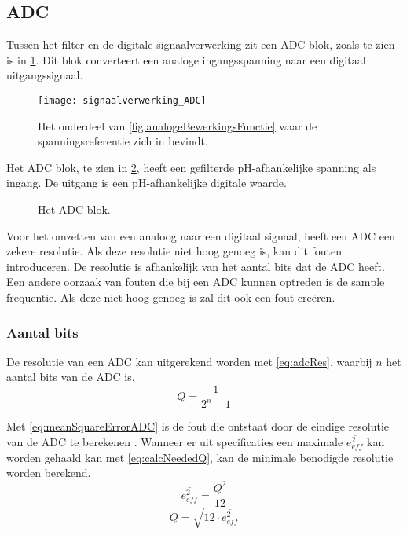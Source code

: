 \subsection{ADC}
Tussen het filter en de digitale signaalverwerking zit een ADC blok, zoals te zien is in \cref{fig:ADCInSchema}. Dit blok converteert een analoge ingangsspanning naar een digitaal uitgangssignaal.

\begin{figure}[!htbp]
    \centering
    \texttt{[image: signaalverwerking\_ADC]}
    \caption{Het onderdeel van \cref{fig:analogeBewerkingsFunctie} waar de spanningsreferentie zich in bevindt.}
    \label{fig:ADCInSchema}
\end{figure}

Het ADC blok, te zien in \cref{fig:ADCBlok}, heeft een gefilterde pH-afhankelijke spanning als ingang. De uitgang is een pH-afhankelijke digitale waarde.

\begin{figure}[!htbp]
    \centering
    \def\svgwidth{0.4\textwidth}
    
    \caption{Het ADC blok.}
    \label{fig:ADCBlok}
\end{figure}

Voor het omzetten van een analoog naar een digitaal signaal, heeft een ADC een zekere resolutie. Als deze resolutie niet hoog genoeg is, kan dit fouten introduceren. De resolutie is afhankelijk van het aantal bits dat de ADC heeft. Een andere oorzaak van fouten die bij een ADC kunnen optreden is de sample frequentie. Als deze niet hoog genoeg is zal dit ook een fout creëren.

\subsubsection{Aantal bits} \label{sec:ADC:numBits}
De resolutie van een ADC kan uitgerekend worden met \cref{eq:adcRes}, waarbij $n$ het aantal bits van de ADC is.
\begin{equation}\label{eq:adcRes}
    Q=\frac{1}{2^n-1}
\end{equation}

Met \cref{eq:meanSquareErrorADC} is de fout die ontstaat door de eindige resolutie van de ADC te berekenen \cite{MJHcalcADC}. Wanneer er uit specificaties een maximale $\overline{e_{eff}^2}$ kan worden gehaald kan met \cref{eq:calcNeededQ}, kan de minimale benodigde resolutie worden berekend.
\begin{equation}\label{eq:meanSquareErrorADC}
    \overline{e_{eff}^2}=\frac{Q^2}{12}
\end{equation}
\begin{equation}\label{eq:calcNeededQ}
    Q=\sqrt{12\cdot\overline{e_{eff}^2}}
\end{equation}

